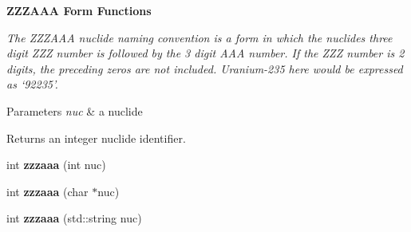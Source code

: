 \begin{Indent}{\bf Z\+Z\+Z\+A\+A\+A Form Functions}\par
{\em The Z\+Z\+Z\+A\+A\+A nuclide naming convention is a form in which the nuclides three digit Z\+Z\+Z number is followed by the 3 digit A\+A\+A number. If the Z\+Z\+Z number is 2 digits, the preceding zeros are not included. Uranium-\/235 here would be expressed as ‘92235’. 
\begin{DoxyParams}{Parameters}
{\em nuc} & a nuclide \\
\hline
\end{DoxyParams}
\begin{DoxyReturn}{Returns}
an integer nuclide identifier. 
\end{DoxyReturn}
}\begin{DoxyCompactItemize}
\item 
\hypertarget{namespacepyne_1_1nucname_a2f94ab045f7240ac0138fd8c312408ba}{int {\bfseries zzzaaa} (int nuc)}\label{namespacepyne_1_1nucname_a2f94ab045f7240ac0138fd8c312408ba}

\item 
\hypertarget{namespacepyne_1_1nucname_a24f3c3ce13d92aec6718b2b00096f6c3}{int {\bfseries zzzaaa} (char $\ast$nuc)}\label{namespacepyne_1_1nucname_a24f3c3ce13d92aec6718b2b00096f6c3}

\item 
\hypertarget{namespacepyne_1_1nucname_aff15f31b4762adb2707c267e9e07b9ac}{int {\bfseries zzzaaa} (std\+::string nuc)}\label{namespacepyne_1_1nucname_aff15f31b4762adb2707c267e9e07b9ac}

\end{DoxyCompactItemize}
\end{Indent}
